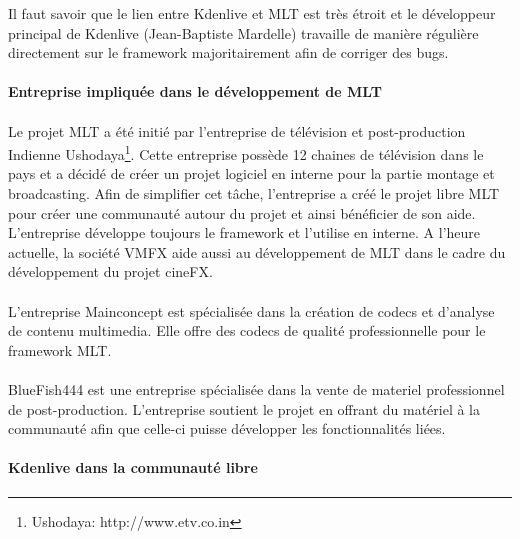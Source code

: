 Il faut savoir que le lien entre Kdenlive et MLT est très étroit et le
développeur principal de Kdenlive (Jean-Baptiste Mardelle) travaille
de manière régulière directement sur le framework majoritairement
afin de corriger des bugs.

\paragraph{Entreprise impliquée dans le développement de MLT}

\paragraph{}

Le projet MLT a été initié par l'entreprise de
télévision et post-production Indienne Ushodaya\footnote{Ushodaya:
http://www.etv.co.in}. Cette entreprise possède 12 chaines de
télévision dans le pays et a décidé de créer un projet logiciel
en interne pour la partie montage et broadcasting. Afin de simplifier
cet tâche, l'entreprise a créé le projet libre MLT pour
créer une communauté autour du projet et ainsi bénéficier de son
aide. L'entreprise développe toujours le framework et l'utilise
en interne. A l'heure actuelle, la société VMFX aide aussi au
développement de MLT dans le cadre du développement du projet cineFX.

\paragraph{}

L'entreprise Mainconcept est spécialisée dans la création de codecs
et d'analyse de contenu multimedia. Elle offre des codecs de qualité
professionnelle pour le framework MLT.

\paragraph{}

BlueFish444 est une entreprise spécialisée dans la vente de materiel
professionnel de post-production. L'entreprise soutient le projet
en offrant du matériel  à la communauté afin que celle-ci puisse
développer les fonctionnalités liées.

\newpage\paragraph{Kdenlive dans la communauté libre}

